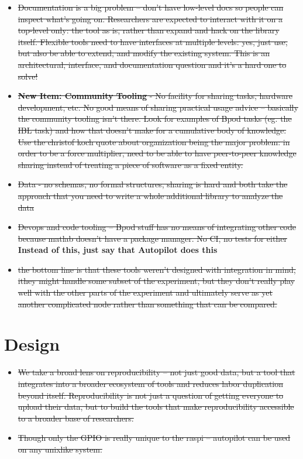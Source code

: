 \begin{itemize}
\item \sout{Documentation is a big problem -- don't have low-level docs so people can inspect what's going on. Researchers are expected to interact with it on a top-level only: the tool as is, rather than expand and hack on the library itself. Flexible tools need to have interfaces at multiple levels: yes, just use, but also be able to extend, and modify the existing system. This is an architectural, interface, and documentation question and it's a hard one to solve!}
\item \sout{\textbf{New Item: Community Tooling} - No facility for sharing tasks, hardware development, etc. No good means of sharing practical usage advice -- basically the community tooling isn't there. Look for examples of Bpod tasks (eg. the IBL task) and how that doesn't make for a cumulative body of knowledge. Use the christof koch quote about organization being the major problem: in order to be a force multiplier, need to be able to have peer-to-peer knowledge sharing instead of treating a piece of software as a fixed entity.}
\item \sout{Data - no schemas, no formal structures, sharing is hard and both take the approach that you need to write a whole additional library to analyze the data}
\item \sout{Devops and code tooling -- Bpod stuff has no means of integrating other code because matlab doesn't have a package manager. No CI, no tests for either} \textbf{Instead of this, just say that Autopilot does this}
\item \sout{the bottom line is that these tools weren't designed with integration in mind, ithey might handle some subset of the experiment, but they don't really play well with the other parts of the experiment and ultimately serve as yet another complicated node rather than something that can be compared.}
\end{itemize}


\section{Design}

\begin{itemize}
\item \sout{We take a broad lens on reproducibility -- not just good data, but a tool that integrates into a broader ecosystem of tools and reduces labor duplication beyond itself. Reproducibility is not just a question of getting everyone to upload their data, but to build the tools that make reproducibility accessible to a broader base of researchers.}
\item \sout{Though only the GPIO is really unique to the raspi -- autopilot can be used on any unixlike system.}
\end{itemize}

